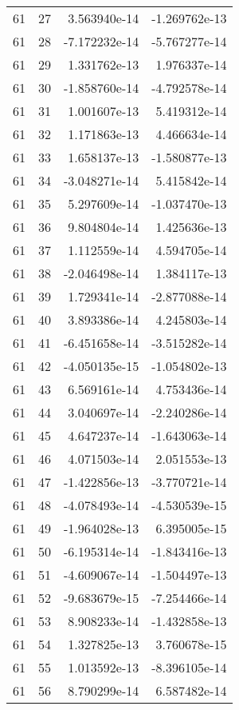 \begin{tabular}{rrrr}
  61 &   27 &  3.563940e-14 & -1.269762e-13 \\
  61 &   28 & -7.172232e-14 & -5.767277e-14 \\
  61 &   29 &  1.331762e-13 &  1.976337e-14 \\
  61 &   30 & -1.858760e-14 & -4.792578e-14 \\
  61 &   31 &  1.001607e-13 &  5.419312e-14 \\
  61 &   32 &  1.171863e-13 &  4.466634e-14 \\
  61 &   33 &  1.658137e-13 & -1.580877e-13 \\
  61 &   34 & -3.048271e-14 &  5.415842e-14 \\
  61 &   35 &  5.297609e-14 & -1.037470e-13 \\
  61 &   36 &  9.804804e-14 &  1.425636e-13 \\
  61 &   37 &  1.112559e-14 &  4.594705e-14 \\
  61 &   38 & -2.046498e-14 &  1.384117e-13 \\
  61 &   39 &  1.729341e-14 & -2.877088e-14 \\
  61 &   40 &  3.893386e-14 &  4.245803e-14 \\
  61 &   41 & -6.451658e-14 & -3.515282e-14 \\
  61 &   42 & -4.050135e-15 & -1.054802e-13 \\
  61 &   43 &  6.569161e-14 &  4.753436e-14 \\
  61 &   44 &  3.040697e-14 & -2.240286e-14 \\
  61 &   45 &  4.647237e-14 & -1.643063e-14 \\
  61 &   46 &  4.071503e-14 &  2.051553e-13 \\
  61 &   47 & -1.422856e-13 & -3.770721e-14 \\
  61 &   48 & -4.078493e-14 & -4.530539e-15 \\
  61 &   49 & -1.964028e-13 &  6.395005e-15 \\
  61 &   50 & -6.195314e-14 & -1.843416e-13 \\
  61 &   51 & -4.609067e-14 & -1.504497e-13 \\
  61 &   52 & -9.683679e-15 & -7.254466e-14 \\
  61 &   53 &  8.908233e-14 & -1.432858e-13 \\
  61 &   54 &  1.327825e-13 &  3.760678e-15 \\
  61 &   55 &  1.013592e-13 & -8.396105e-14 \\
  61 &   56 &  8.790299e-14 &  6.587482e-14 \\

\end{tabular}
